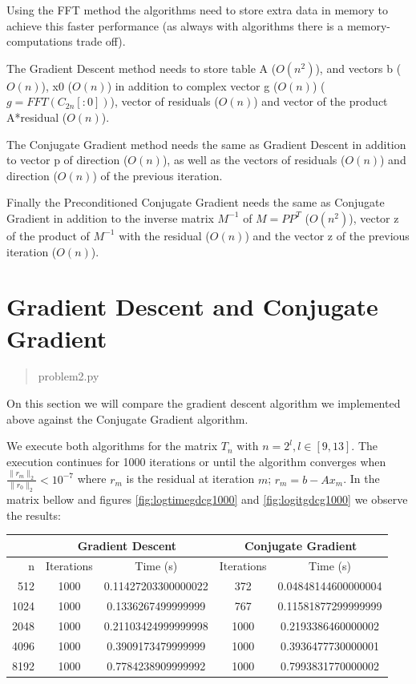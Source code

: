 \documentclass[a4paper]{article}
\begin{document}
Using the FFT method the algorithms need to store extra data in memory to achieve this faster performance (as always with algorithms there is a memory-computations trade off).

The Gradient Descent method needs to store table A ($O(n^2)$), and vectors b ($O(n)$), x0 ($O(n)$) in addition to complex vector g ($O(n)$) ($g=FFT(C_{2n}[:0])$), vector of residuals ($O(n)$) and vector of the product A*residual ($O(n)$).

The Conjugate Gradient method needs the same as Gradient Descent in addition to vector p of direction ($O(n)$), as well as the vectors of residuals ($O(n)$) and direction ($O(n)$) of the previous iteration.

Finally the Preconditioned Conjugate Gradient needs the same as Conjugate Gradient in addition to the inverse matrix $M^{-1}$ of $M = PP^T$ ($O(n^2)$), vector z of the product of $M^{-1}$ with the residual ($O(n)$) and the vector z of the previous iteration ($O(n)$).

\section{Gradient Descent and Conjugate Gradient}
\begin{quote}
	problem2.py
\end{quote}
On this section we will compare the gradient descent algorithm we implemented above against the Conjugate Gradient algorithm.

We execute both algorithms for the matrix $T_n$ with $n=2^l, l \in [9,13]$. The execution continues for 1000 iterations or until the algorithm converges when $\frac{\|r_m\|_2}{\|r_0\|_2} < 10^{-7}$ where $r_m$ is the residual at iteration $m$; $r_m = b - Ax_{m}$. In the matrix bellow  and figures \ref{fig:logtimegdcg1000} and \ref{fig:logitgdcg1000} we observe the results:

\begin{center}
	\begin{tabular}{r | c | c | c | c }
		& \multicolumn{2}{c}{Gradient Descent} & \multicolumn{2}{c}{Conjugate Gradient}\\ \hline
		n & Iterations & Time (s) & Iterations & Time (s)\\ \hline
		512 & 1000 & 0.11427203300000022 & 372 & 0.04848144600000004\\ \hline
		1024 & 1000 & 0.1336267499999999 & 767 & 0.11581877299999999\\ \hline
		2048 & 1000 & 0.21103424999999998 & 1000 & 0.2193386460000002\\ \hline
		4096 & 1000 & 0.3909173479999999 & 1000 & 0.3936477730000001\\ \hline
		8192 & 1000 & 0.7784238909999992 & 1000 & 0.7993831770000002\\ \hline
	\end{tabular} 
\end{center}
\end{document}
